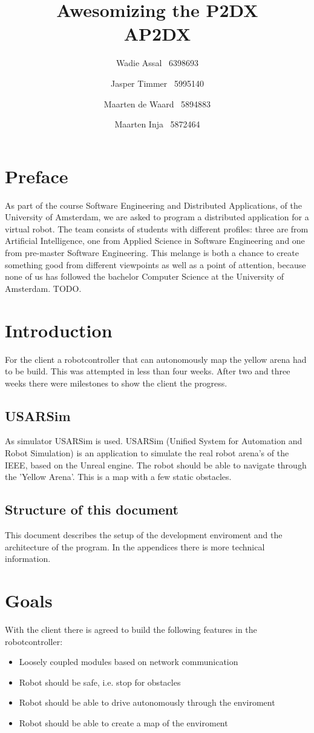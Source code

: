 \documentclass[a4paper,10pt]{article}
\title{Awesomizing the P2DX\\\small AP2DX}
\author{Wadie Assal \ 6398693 \and Jasper Timmer \ 5995140 \and Maarten de Waard \ 5894883 \and  Maarten Inja \ 5872464}
\begin{document}
\maketitle
\newpage

\section{Preface}
As part of the course Software Engineering and Distributed Applications, of the University of Amsterdam, we are asked to program a distributed application for a virtual robot. The team consists of students with different profiles: three are from Artificial Intelligence, one from Applied Science in Software Engineering and one from pre-master Software Engineering. This melange is both a chance to create something good from different viewpoints as well as a point of attention, because none of us has followed the bachelor Computer Science at the University of Amsterdam. TODO.

\newpage

\section{Introduction}
For the client a robotcontroller that can autonomously map the yellow arena had to be build. This was attempted in less than four weeks. After two and three weeks there were milestones to show the client the progress.

\subsection{USARSim}
As simulator USARSim is used. USARSim (Unified System for Automation and Robot Simulation) is an application to simulate the real robot arena's of the IEEE, based on the Unreal engine. The robot should be able to navigate through the 'Yellow Arena'. This is a map with a few static obstacles.

\subsection{Structure of this document}
This document describes the setup of the development enviroment and the architecture of the program. In the appendices there is more technical information.

\section{Goals}
With the client there is agreed to build the following features in the robotcontroller:
\begin{itemize}
\item Loosely coupled modules based on network communication
\item Robot should be safe, i.e. stop for obstacles
\item Robot should be able to drive autonomously through the enviroment
\item Robot should be able to create a map of the enviroment
\end{itemize}
\end{document}
